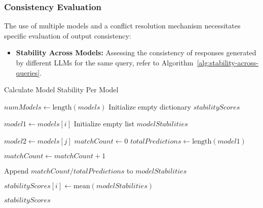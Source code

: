 \subsubsection{Consistency Evaluation}
The use of multiple models and a conflict resolution mechanism necessitates specific evaluation of output consistency:

\begin{itemize}
    \item \textbf{Stability Across Models:} Assessing the consistency of responses generated by different LLMs for the same query, refer to Algorithm~\ref{alg:stability-across-queries}.
\end{itemize}
\begin{algorithm}
    \caption{Calculate Model Stability Per Model}
    \begin{algorithmic}[1]
         
            \State $numModels \gets \text{length}(models)$
            \State Initialize empty dictionary $stabilityScores$

                \State $model1 \gets models[i]$
                \State Initialize empty list $modelStabilities$

                        \State $model2 \gets models[j]$
                        \State $matchCount \gets 0$
                        \State $totalPredictions \gets \text{length}(model1)$

                                \State $matchCount \gets matchCount + 1$
                            \EndIf
                        \EndFor

                        \State Append $matchCount / totalPredictions$ to $modelStabilities$
                    \EndIf
                \EndFor

                \State $stabilityScores[i] \gets \text{mean}(modelStabilities)$
            \EndFor

            \State \Return $stabilityScores$ 
        \EndProcedure
    \end{algorithmic}\label{alg:stability-across-queries}
\end{algorithm}
